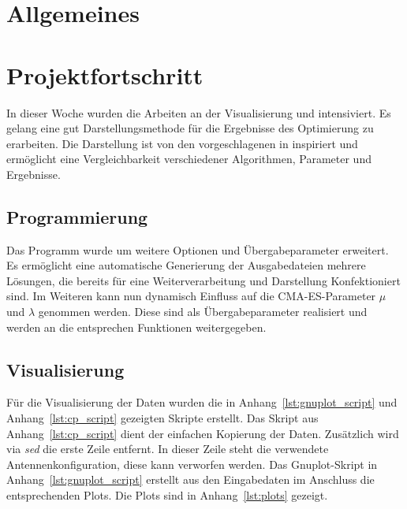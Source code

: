 \documentclass[a4paper,12pt,fleqn]{article}
\begin{document}
\setlength{\headheight}{36pt}

\begin{titlepage}



\end{titlepage}

\section[Allgemeines]{Allgemeines}
%
\section[Fortschritt]{Projektfortschritt}
%
In dieser Woche wurden die Arbeiten an der Visualisierung und intensiviert. Es gelang eine gut Darstellungsmethode für die Ergebnisse des Optimierung zu erarbeiten. Die Darstellung ist von den vorgeschlagenen in \cite{Hansen:2,Hansen:3} inspiriert und ermöglicht eine Vergleichbarkeit verschiedener Algorithmen, Parameter und Ergebnisse.
%
\subsection{Programmierung}
%
Das Programm wurde um weitere Optionen und Übergabeparameter erweitert. Es ermöglicht eine automatische Generierung der Ausgabedateien mehrere Lösungen, die bereits für eine Weiterverarbeitung und Darstellung Konfektioniert sind. Im Weiteren kann nun dynamisch Einfluss auf die CMA-ES-Parameter $\mu$ und $\lambda$ genommen werden. Diese sind als Übergabeparameter realisiert und werden an die entsprechen Funktionen weitergegeben. 
%
\subsection{Visualisierung}
%
Für die Visualisierung der Daten wurden die in Anhang~\ref{lst:gnuplot_script} und Anhang~\ref{lst:cp_script} gezeigten Skripte erstellt. Das Skript aus Anhang~\ref{lst:cp_script} dient der einfachen Kopierung der Daten. Zusätzlich wird via \textit{sed} die erste Zeile entfernt. In dieser Zeile steht die verwendete Antennenkonfiguration, diese kann verworfen werden. Das Gnuplot-Skript in Anhang~\ref{lst:gnuplot_script} erstellt aus den Eingabedaten im Anschluss die entsprechenden Plots. Die Plots sind in Anhang~\ref{lst:plots} gezeigt.
\end{document}
